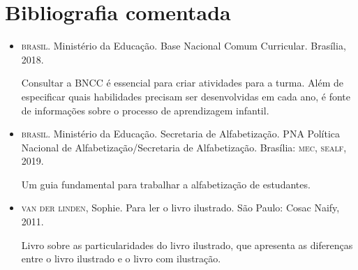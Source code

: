 \documentclass[11pt]{extarticle}
\begin{document}
\section{Bibliografia comentada}

\begin{itemize}
\item \textsc{brasil}. Ministério da Educação. Base Nacional Comum Curricular. Brasília, 2018.

Consultar a \textsc{BNCC} é essencial para criar atividades para a turma. Além de especificar 
quais habilidades precisam ser desenvolvidas em cada ano, é fonte de informações sobre 
o processo de aprendizagem infantil. 
 
\item \textsc{brasil}. Ministério da Educação. Secretaria de Alfabetização. PNA Política Nacional de Alfabetização/Secretaria 
de Alfabetização. Brasília: \textsc{mec, sealf}, 2019.

Um guia fundamental para trabalhar a alfabetização de estudantes.

\item \textsc{van der linden}, Sophie. Para ler o livro ilustrado. São Paulo: Cosac Naify, 2011.

Livro sobre as particularidades do livro ilustrado, que apresenta as diferenças entre o livro ilustrado e o livro com ilustração. 
\end{itemize}
\end{document}
